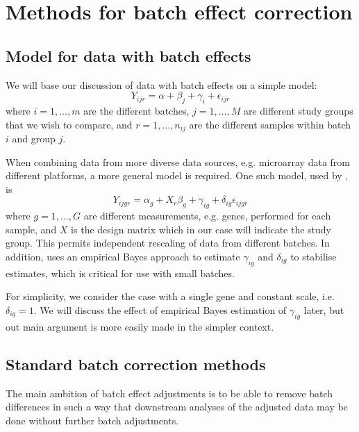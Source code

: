 \documentclass{bio}
\begin{document}
\section{Methods for batch effect correction}

\subsection{Model for data with batch effects}

We will base our discussion of data with batch effects on a simple model:
\begin{equation}
Y_{ijr}=\alpha+\beta_j+\gamma_i+\epsilon_{ijr}
\end{equation}
where $i=1,\ldots,m$ are the different batches, $j=1,\ldots,M$ are different study groups that we wish to compare, and $r=1,\ldots,n_{ij}$ are the different samples within batch $i$ and group $j$.

When combining data from more diverse data sources, e.g. microarray data from different platforms, a more general model is required. One such model, used by \citet{Johnson2007}, is
\begin{equation}
Y_{ijgr}=\alpha_g+X_r\beta_{g}+\gamma_{ig}+\delta_{ig}\epsilon_{ijgr}
\end{equation}
where $g=1,\ldots,G$ are different measurements, e.g. genes, performed for each sample, and $X$ is the design matrix which in our case will indicate the study group. This permits independent rescaling of data from different batches. In addition, \citet{Johnson2007} uses an empirical Bayes approach to estimate $\gamma_{ig}$ and $\delta_{ig}$ to stabilise estimates, which is critical for use with small batches.

For simplicity, we consider the case with a single gene and constant scale, i.e. $\delta_{ig}=1$. We will discuss the effect of empirical Bayes estimation of $\gamma_{ig}$ later, but out main argument is more easily made in the simpler context.

\subsection{Standard batch correction methods}

The main ambition of batch effect adjustments is to be able to remove batch differences in such a way that downstream analyses of the adjusted data may be done without further batch adjustments.
\end{document}
